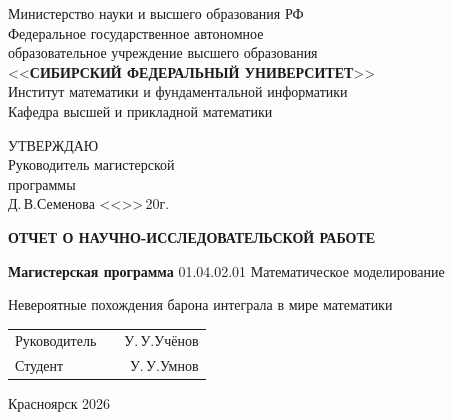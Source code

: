 \begin{titlepage}
\begin{center}
Министерство науки и высшего образования РФ\\
Федеральное государственное автономное \\
образовательное учреждение высшего образования\\
<<\textbf{СИБИРСКИЙ ФЕДЕРАЛЬНЫЙ УНИВЕРСИТЕТ}>> \\
Институт математики и фундаментальной информатики\\
Кафедра высшей и прикладной математики
\end{center}
\vspace{5mm}

\begin{flushright}
	\begin{minipage}{0.4\textwidth}
	УТВЕРЖДАЮ\\
	Руководитель магистерской\\ программы\\
	\underline{\hspace{1.5cm}}\quad Д.\,В.\;Семенова
	<<\underline{\hspace{1cm}}>>\;\underline{\hspace{2cm}}\,20\underline{\hspace{0.75cm}}г.
	\end{minipage}	
\end{flushright}
\vspace{5mm}

\begin{center}

\textbf{ОТЧЕТ О НАУЧНО-ИССЛЕДОВАТЕЛЬСКОЙ РАБОТЕ}

\vspace{3mm}
\textbf{Магистерская программа} 01.04.02.01 Математическое моделирование
\vspace{3mm}

Невероятные похождения барона интеграла в мире математики
 \end{center}
\vspace{5mm}

\vspace*{\fill}
\begin{center}
\begin{tabular}{p{}cr}
	Руководитель & \underline{\hspace{2cm}}  & У.\,У.\;Учёнов\\
	Студент \quad \underline{\hspace{4cm}}&  \underline{\hspace{2cm}} & У.\,У.\;Умнов
\end{tabular}
\end{center}
\vspace*{\fill}

\begin{center}

{Красноярск 2026}

\end{center}
\end{titlepage}
